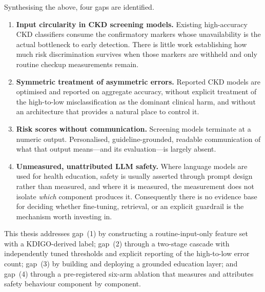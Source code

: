 Synthesising the above, four gaps are identified.

\begin{enumerate}
  \item \textbf{Input circularity in CKD screening models.} Existing
        high-accuracy CKD classifiers consume the confirmatory markers whose
        unavailability is the actual bottleneck to early detection. There is
        little work establishing how much risk discrimination survives when
        those markers are withheld and only routine checkup measurements
        remain.
  \item \textbf{Symmetric treatment of asymmetric errors.} Reported CKD models
        are optimised and reported on aggregate accuracy, without explicit
        treatment of the high-to-low misclassification as the dominant clinical
        harm, and without an architecture that provides a natural place to
        control it.
  \item \textbf{Risk scores without communication.} Screening models terminate
        at a numeric output. Personalised, guideline-grounded, readable
        communication of what that output means---and its evaluation---is
        largely absent.
  \item \textbf{Unmeasured, unattributed LLM safety.} Where language models are
        used for health education, safety is usually asserted through prompt
        design rather than measured, and where it is measured, the measurement
        does not isolate \emph{which} component produces it. Consequently there
        is no evidence base for deciding whether fine-tuning, retrieval, or an
        explicit guardrail is the mechanism worth investing in.
\end{enumerate}

This thesis addresses gap~(1) by constructing a routine-input-only feature set
with a KDIGO-derived label; gap~(2) through a two-stage cascade with
independently tuned thresholds and explicit reporting of the high-to-low error
count; gap~(3) by building and deploying a grounded education layer; and
gap~(4) through a pre-registered six-arm ablation that measures and attributes
safety behaviour component by component.
